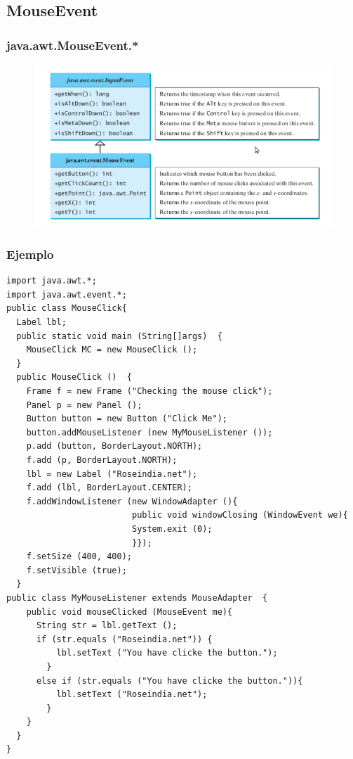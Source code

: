 \documentclass{beamer}
\begin{document}
\subsection{MouseEvent}
\begin{frame}
\frametitle{java.awt.MouseEvent.*}
\begin{figure}
\includegraphics[width=\textwidth]{imagenes/mousevent.png}
\end{figure}
\end{frame}

\begin{frame}[fragile]
\frametitle{Ejemplo} 
\begin{tiny}
\begin{verbatim}
import java.awt.*;
import java.awt.event.*;
public class MouseClick{
  Label lbl;
  public static void main (String[]args)  {
    MouseClick MC = new MouseClick ();
  }
  public MouseClick ()  {
    Frame f = new Frame ("Checking the mouse click");
    Panel p = new Panel ();
    Button button = new Button ("Click Me");
    button.addMouseListener (new MyMouseListener ());
    p.add (button, BorderLayout.NORTH);
    f.add (p, BorderLayout.NORTH);
    lbl = new Label ("Roseindia.net");
    f.add (lbl, BorderLayout.CENTER);
    f.addWindowListener (new WindowAdapter (){
                         public void windowClosing (WindowEvent we){
                         System.exit (0);
                         }});
    f.setSize (400, 400);
    f.setVisible (true);
  }
public class MyMouseListener extends MouseAdapter  {
    public void mouseClicked (MouseEvent me){
      String str = lbl.getText ();
      if (str.equals ("Roseindia.net")) {
          lbl.setText ("You have clicke the button.");
        }
      else if (str.equals ("You have clicke the button.")){
          lbl.setText ("Roseindia.net");
        }
    }
  }
}
\end{verbatim}
\end{tiny}
\end{frame}
\end{document}
